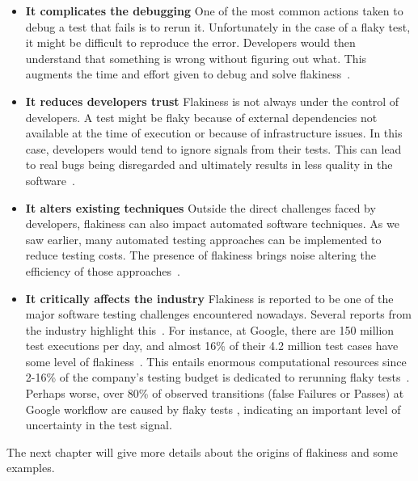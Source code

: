 \begin{itemize}[label={}]
    \item \textbf{It complicates the debugging} 
    One of the most common actions taken to debug a test that fails is to rerun it. Unfortunately in the case of a flaky test, it might be difficult to reproduce the error. Developers would then understand that something is wrong without figuring out what. This augments the time and effort given to debug and solve flakiness~\cite{perscheid2017studying}.
    
    \item \textbf{It reduces developers trust} 
    Flakiness is not always under the control of developers. A test might be flaky because of external dependencies not available at the time of execution or because of infrastructure issues. In this case, developers would tend to ignore signals from their tests. This can lead to real bugs being disregarded and ultimately results in less quality in the software~\cite{Eck2019}.
    
    \item \textbf{It alters existing techniques} 
    Outside the direct challenges faced by developers, flakiness can also impact automated software techniques. As we saw earlier, many automated testing approaches can be implemented to reduce testing costs. The presence of flakiness brings noise altering the efficiency of those approaches~\cite{qin2021impact,Cordy2019}.

    \item \textbf{It critically affects the industry}
    Flakiness is reported to be one of the major software testing challenges encountered nowadays. Several reports from the industry highlight this~\cite{JiangHuawei,Harman2018,Mozilla,FlakinessSpotify,FlakinessGoogle,GTAC2016}. For instance, at Google, there are 150 million test executions per day, and almost 16\% of their 4.2 million test cases have some level of flakiness~\cite{Micco2017}. This entails enormous computational resources since 2-16\% of the company's testing budget is dedicated to rerunning flaky tests~\cite{GTAC2016}. Perhaps worse, over 80\% of observed transitions (false Failures or Passes) at Google workflow are caused by flaky tests \cite{LeongSPTM19}, indicating an important level of uncertainty in the test signal.

\end{itemize}

The next chapter will give more details about the origins of flakiness and some examples. 

